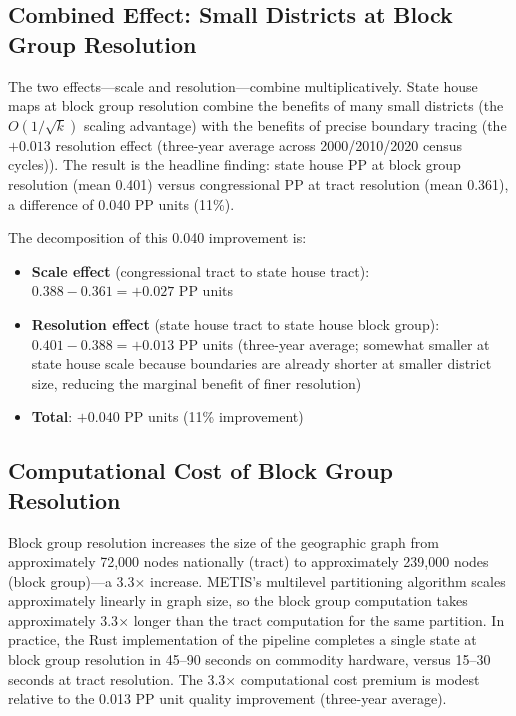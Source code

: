 \subsection{Combined Effect: Small Districts at Block Group Resolution}

The two effects---scale and resolution---combine multiplicatively. State house maps at block group resolution combine the benefits of many small districts (the $O(1/\sqrt{k})$ scaling advantage) with the benefits of precise boundary tracing (the $+0.013$ resolution effect (three-year average across 2000/2010/2020 census cycles)). The result is the headline finding: state house PP at block group resolution (mean 0.401) versus congressional PP at tract resolution (mean 0.361), a difference of 0.040 PP units (11\%).

The decomposition of this 0.040 improvement is:
\begin{itemize}
\item \textbf{Scale effect} (congressional tract to state house tract): $0.388 - 0.361 = +0.027$ PP units
\item \textbf{Resolution effect} (state house tract to state house block group): $0.401 - 0.388 = +0.013$ PP units (three-year average; somewhat smaller at state house scale because boundaries are already shorter at smaller district size, reducing the marginal benefit of finer resolution)
\item \textbf{Total}: $+0.040$ PP units (11\% improvement)
\end{itemize}

\subsection{Computational Cost of Block Group Resolution}

Block group resolution increases the size of the geographic graph from approximately 72,000 nodes nationally (tract) to approximately 239,000 nodes (block group)---a 3.3$\times$ increase. METIS's multilevel partitioning algorithm scales approximately linearly in graph size, so the block group computation takes approximately 3.3$\times$ longer than the tract computation for the same partition. In practice, the Rust implementation of the pipeline completes a single state at block group resolution in 45--90 seconds on commodity hardware, versus 15--30 seconds at tract resolution. The 3.3$\times$ computational cost premium is modest relative to the 0.013 PP unit quality improvement (three-year average).
